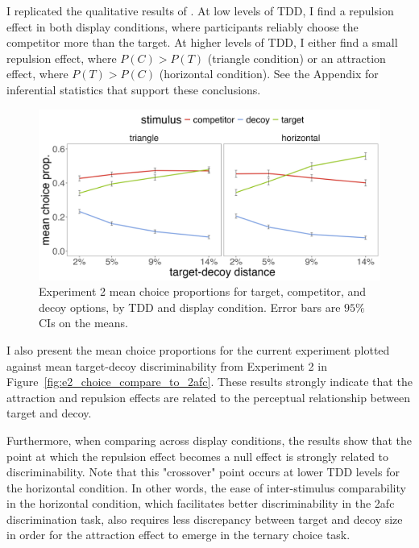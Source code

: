 I replicated the qualitative results of \textcite{spektorWhenGoodLooks2018b}. At low levels of TDD, I find a repulsion effect in both display conditions, where participants reliably choose the competitor more than the target. At higher levels of TDD, I either find a small repulsion effect, where $P(C)>P(T)$ (triangle condition) or an attraction effect, where $P(T)>P(C)$ (horizontal condition). See the Appendix for inferential statistics that support these conclusions.

\begin{figure}
   \includegraphics[width=\textwidth]{figures/choicePhase_att_trials_mean_choice_props_collapsed.jpg}
   \caption{Experiment 2 mean choice proportions for target, competitor, and decoy options, by TDD and display condition. Error bars are $95\%$ CIs on the means.}
   \label{fig:e2_choiceprops}
\end{figure}

I also present the mean choice proportions for the current experiment plotted against mean target-decoy discriminability from Experiment 2 in Figure~\ref{fig:e2_choice_compare_to_2afc}. These results strongly indicate that the attraction and repulsion effects are related to the perceptual relationship between target and decoy. 

Furthermore, when comparing across display conditions, the results show that the point at which the repulsion effect becomes a null effect is strongly related to discriminability. Note that this "crossover" point occurs at lower TDD levels for the horizontal condition. In other words, the ease of inter-stimulus comparability in the horizontal condition, which facilitates better discriminability in the 2afc discrimination task, also requires less discrepancy between target and decoy size in order for the attraction effect to emerge in the ternary choice task.

